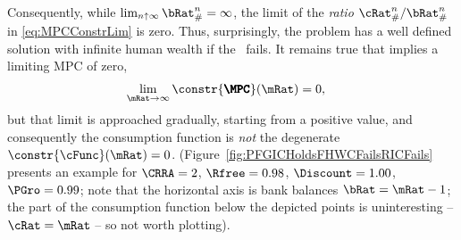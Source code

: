 \documentclass[\econtexRoot/BufferStockTheory]{subfiles}
\begin{document}
Consequently, while $\lim_{n \uparrow \infty} \bRat_{\#}^{n} = \infty$, the limit of the \textit{ratio} $\cRat_{\#}^{n}/\bRat_{\#}^{n}$ in \eqref{eq:MPCConstrLim} is zero.
Thus, surprisingly, the problem has a well defined solution with
infinite human wealth if the \RIC~fails.  It remains true that \cncl{\RIC}
implies a limiting MPC of zero,
\begin{equation}\begin{gathered}\begin{aligned}
  \lim_{\mRat \rightarrow \infty} \constr{\pmb{\MPC}}(\mRat)   & = 0,
\end{aligned}\end{gathered}\end{equation}
but that limit is approached gradually, starting from a positive
value, and consequently the consumption function is {\it not} the
degenerate $\constr{\cFunc}(\mRat)=0$.  (Figure~\ref{fig:PFGICHoldsFHWCFailsRICFails} presents an example for $\CRRA=2$, $\Rfree=0.98$, $\Discount = 1.00$, $\PGro = 0.99$; note that the horizontal axis is bank balances $\bRat = \mRat-1$; the part of the consumption function below the depicted points is uninteresting -- $\cRat = \mRat$ -- so not worth plotting).

% 

\end{document}
